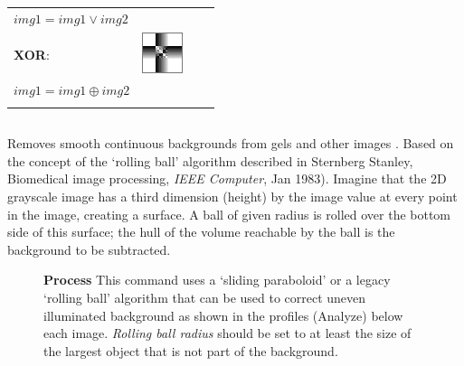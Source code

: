 \begin{table}[h]
\begin{tabular}{llll}
\quad{} $img1=img1\vee img2$ &  &  & \tabularnewline\addlinespace
\addlinespace
\index{XOR@XOR  \see{Logical operations,}}\textbf{XOR}: & \multirow{1}{*}{\includegraphics[scale=0.75]{images/ImgCalculator/XOR}} &  & \tabularnewline
\quad{}$img1=img1\oplus img2$ &  &  & \tabularnewline
 &  &  & \tabularnewline
\bottomrule
\end{tabular}
\end{table}





\subsection{\protect{}\label{sub:Subtract-Background...}}

Removes smooth continuous backgrounds from gels and other images \cite{C-SubtractBackground}.
Based on the concept of the `rolling ball' algorithm described in
Sternberg Stanley, Biomedical image processing, \emph{IEEE Computer},
Jan 1983). Imagine that the 2D grayscale image has a third dimension
(height) by the image value at every point in the image, creating
a surface. A ball of given radius is rolled over the bottom side of
this surface; the hull of the volume reachable by the ball is the
background to be subtracted.
\begin{figure}[h]
\caption{\textsf{\textbf{Process\lyxarrow{}}}
This command uses a `sliding paraboloid' or a legacy `rolling ball'
algorithm that can be used to correct uneven illuminated background
as shown in the profiles (\textsf{Analyze\lyxarrow{}})
below each image. \emph{Rolling ball radius} should be set to at least
the size of the largest object that is not part of the background.}
\end{figure}

